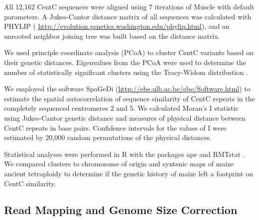 All 12,162 CentC sequences were aligned using 7 iterations of Muscle \citep{Edgar2004} with default parameters.
A Jukes-Cantor distance matrix of all sequences was calculated with PHYLIP (\citep{Felsenstein1989} \url{http://evolution.genetics.washington.edu/phylip.html}), and an unrooted neighbor joining tree was built based on the distance matrix.  
	
We used principle coordinate analysis (PCoA) to cluster CentC variants based on their genetic distances. 
Eigenvalues from the PCoA were used to determine the number of statistically significant clusters using the Tracy-Widom distribution \citep{Patterson2006}.  
	
We employed the software SpaGeDi (\citep{Hardy2002}\url{http://ebe.ulb.ac.be/ebe/Software.html}) to estimate the spatial autocorrelation of sequence similarity of CentC repeats in the completely sequenced centromeres 2 and 5.
We calculated Moran’s I statistic using Jukes-Cantor genetic distance and measures of physical distance between CentC repeats in base pairs.
Confidence intervals for the values of I were estimated by 20,000 random permutations of the physical distances.  
	
Statistical analyses were performed in R with the packages ape \citep{Paradis2004} and RMTstat \citep{Perry2009}.  
We compared clusters to chromosome of origin and syntenic maps of maize ancient tetraploidy \citep{Schnable2011} to determine if the genetic history of maize left a footprint on CentC similarity.

\subsection*{Read Mapping and Genome Size Correction}
	
